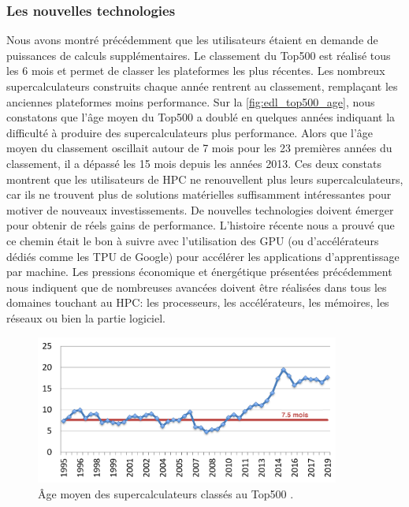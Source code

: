     \subsubsection{Les nouvelles technologies}\label{sec:edl_chal_new_techno}

        Nous avons montré précédemment que les utilisateurs étaient en demande de puissances de calculs supplémentaires. 
        Le classement du Top500 est réalisé tous les 6 mois et permet de classer les plateformes les plus récentes. Les nombreux supercalculateurs construits chaque année rentrent au classement, remplaçant les anciennes plateformes moins performance. Sur la \autoref{fig:edl_top500_age}, nous constatons que l'âge moyen du Top500 a doublé en quelques années indiquant la difficulté à produire des supercalculateurs plus performance. Alors que l'âge moyen du classement oscillait autour de 7 mois pour les 23 premières années du classement, il a dépassé les 15 mois depuis les années 2013. Ces deux constats montrent que les utilisateurs de HPC ne renouvellent plus leurs supercalculateurs, car ils ne trouvent plus de solutions matérielles suffisamment intéressantes pour motiver de nouveaux investissements. De nouvelles technologies doivent émerger pour obtenir de réels gains de performance. L'histoire récente nous a prouvé que ce chemin était le bon à suivre avec l'utilisation des GPU (ou d'accélérateurs dédiés comme les TPU de Google) pour accélérer les applications d'apprentissage par machine. Les pressions économique et énergétique présentées précédemment nous indiquent que de nombreuses avancées doivent être réalisées dans tous les domaines touchant au HPC: les processeurs, les accélérateurs, les mémoires, les réseaux ou bien la partie logiciel. 
        
        
                  
            \begin{figure}
                \center
                \includegraphics[width=10cm]{images/edl_top500_age.png}
                \caption{\label{fig:edl_top500_age} Âge moyen des supercalculateurs classés au Top500 \cite{Strohmaier2018}.}
            \end{figure}
       
